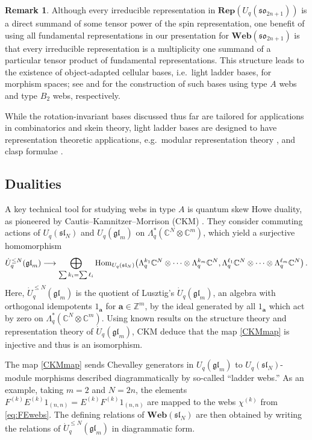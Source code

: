 \documentclass[10pt]{amsart}
\numberwithin{equation}{section}
\theoremstyle{definition}
\newtheorem{rem}[thm]{Remark}
\newcommand{\Hom}{{\rm Hom}}
\def\C{{\mathbb C}}
\newcommand{\sln}[1][n]{\mathfrak{sl}_{#1}}
\newcommand{\glm}{\mathfrak{gl}_{m}}
\newcommand{\son}[1][2n+1]{\mathfrak{so}_{#1}}
\newcommand{\Rep}{\mathbf{Rep}}
\newcommand{\Web}{\mathbf{Web}}
\newcommand{\wt}{\mathbf{a}}
\begin{document}
\begin{rem}\label{rem:topsummand}
Although every irreducible representation in $\Rep(U_q(\son))$ is a direct summand 
of some tensor power of the spin representation, 
one benefit of using all fundamental representations in our presentation for $\Web(\son)$ is that 
every irreducible representation is a multiplicity one summand 
of a particular tensor product of fundamental representations.  
This structure leads to the existence of object-adapted cellular bases, 
i.e.~light ladder bases, for morphism spaces; 
see \cite{EliasLL} and \cite{Bodish} 
for the construction of such bases using type $A$ webs and type $B_2$ webs, respectively.

While the rotation-invariant bases discussed thus far are tailored for applications 
in combinatorics and skein theory, 
light ladder bases are designed to have representation theoretic applications,
e.g.~modular representation theory \cite{EliasLL, Bodish}, 
and clasp formulae \cite{EliasLL, MR4413286, BodishWu2026}. 
\end{rem}


\subsection{Dualities}

A key technical tool for studying webs in type $A$ is quantum skew Howe duality,  
as pioneered by Cautis--Kamnitzer--Morrison (CKM) \cite{CKM}. 
They consider commuting actions of $U_q(\sln[N])$ and $U_q(\glm)$ on 
$\Lambda_q^*(\C^N\otimes \C^m)$, which yield a surjective homomorphism
\begin{equation}\label{CKMmap}
\dot{U}_q^{\le N}(\glm) \longrightarrow 
\bigoplus_{\sum k_i = \sum \ell_i} 
\Hom_{U_q(\sln[N])} \big(\Lambda_q^{k_1}\C^N \otimes \cdots \otimes \Lambda_q^{k_m}\C^N
	, \Lambda_q^{\ell_1} \C^N \otimes \cdots \otimes \Lambda_q^{\ell_m}\C^N \big) \, .
\end{equation}
Here, $\dot{U}_q^{\le N}(\glm)$ is the quotient of Lusztig's $\dot{U}_q(\glm)$, 
an algebra with orthogonal idempotents $1_{\wt}$ for $\wt\in \mathbb{Z}^m$, 
by the ideal generated by all $1_{\wt}$ which act by zero on $\Lambda_q^*(\C^N\otimes \C^m)$. 
Using known results on the structure theory and representation theory of $\dot{U}_q(\glm)$, 
CKM deduce that the map \ref{CKMmap} is injective and thus is an isomorphism.

The map \eqref{CKMmap} sends Chevalley generators in $U_q(\glm)$ to $U_q(\sln[N])$-module morphisms 
described diagrammatically by so-called ``ladder webs.''
As an example, taking $m=2$ and $N=2n$, the elements 
$F^{(k)}E^{(k)}1_{(n,n)} = E^{(k)}F^{(k)}1_{(n,n)}$ are mapped to the webs
$\chi^{(k)}$ from \eqref{eq:FEwebs}.
The defining relations of $\Web(\sln[N])$ are then obtained by 
writing the relations of $\dot{U}_q^{\le N}(\glm)$ in diagrammatic form.
\end{document}
